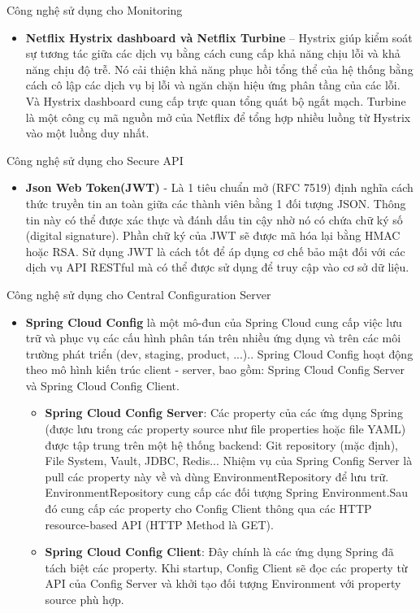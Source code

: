 		Công nghệ sử dụng cho Monitoring
		\begin{itemize}
		    \item \textbf{Netflix Hystrix dashboard và Netflix Turbine} –  Hystrix giúp kiểm soát sự tương tác giữa các dịch vụ bằng cách cung cấp khả năng chịu lỗi và khả năng chịu độ trễ. Nó cải thiện khả năng phục hồi tổng thể của hệ thống bằng cách cô lập các dịch vụ bị lỗi và ngăn chặn hiệu ứng phân tầng của các lỗi. Và Hystrix dashboard cung cấp trực quan tổng quát bộ ngắt mạch. Turbine là một công cụ mã nguồn mở của Netflix để tổng hợp nhiều luồng từ Hystrix vào một luồng duy nhất.
		\end{itemize}
		Công nghệ sử dụng cho Secure API
		\begin{itemize}
		    \item \textbf{Json Web Token(JWT)} - Là 1 tiêu chuẩn mở (RFC 7519) định nghĩa cách thức truyền tin an toàn giữa các thành viên bằng 1 đối tượng JSON. Thông tin này có thể được xác thực và đánh dấu tin cậy nhờ nó có chứa chữ ký số (digital signature). Phần chữ ký của JWT sẽ được mã hóa lại bằng HMAC hoặc RSA. Sử dụng JWT là cách tốt để áp dụng cơ chế bảo mật đối với các dịch vụ API RESTful mà có thể được sử dụng để truy cập vào cơ sở dữ liệu.
		\end{itemize}
		Công nghệ sử dụng cho Central Configuration Server
		\begin{itemize}
		    \item \textbf{Spring Cloud Config} là một mô-đun của Spring Cloud cung cấp việc lưu trữ và phục vụ các cấu hình phân tán trên nhiều ứng dụng và trên các môi trường phát triển (dev, staging, product, ...).. Spring Cloud Config hoạt động theo mô hình kiến trúc client - server, bao gồm: Spring Cloud Config Server và Spring Cloud Config Client.
		    \begin{itemize}
		        \item \textbf{Spring Cloud Config Server}: Các property của các ứng dụng Spring (được lưu trong các property source như file properties hoặc file YAML) được tập trung trên một hệ thống backend: Git repository (mặc định), File System, Vault, JDBC, Redis... Nhiệm vụ của Spring Config Server là pull các property này về và dùng EnvironmentRepository để lưu trữ. EnvironmentRepository cung cấp các đối tượng Spring Environment.Sau đó cung cấp các property cho Config Client thông qua các HTTP resource-based API (HTTP Method là GET).
		        \item \textbf{Spring Cloud Config Client}: Đây chính là các ứng dụng Spring đã tách biệt các property. Khi startup, Config Client sẽ đọc các property từ API của Config Server và khởi tạo đối tượng Environment với property source phù hợp.
		    \end{itemize}
		\end{itemize}
